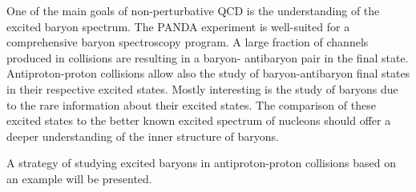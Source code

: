 One of the main goals of non-perturbative QCD is the understanding of the excited baryon spectrum. 
The PANDA experiment is well-suited for a comprehensive baryon spectroscopy program. 
A large fraction of channels produced in \pbarpSystem collisions are resulting in a baryon- antibaryon pair in the final state.\\
Antiproton-proton collisions allow also the study of baryon-antibaryon final states in their respective excited states. 
Mostly interesting is the study of \cascade baryons due to the rare information about their excited states.
The comparison of these excited states to the better known excited spectrum of nucleons should offer a deeper understanding of the inner structure of baryons.

\noindent A strategy of studying excited \cascade baryons in antiproton-proton collisions based on an example will be presented.



